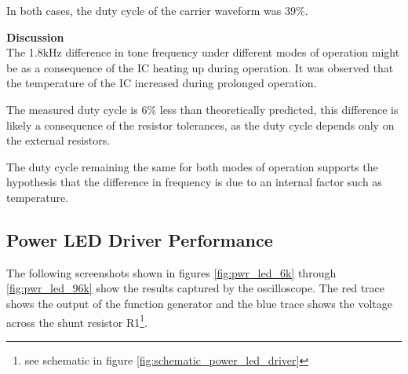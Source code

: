 In both cases, the duty cycle of the carrier waveform was 39\%.


\textbf{Discussion}\\
The 1.8kHz difference in tone frequency under different modes of operation might be as a consequence of the IC heating up during operation. It was observed that the temperature of the IC increased during prolonged operation.

The measured duty cycle is 6\% less than theoretically predicted, this difference is likely a consequence of the resistor tolerances, as the duty cycle depends only on the external resistors.

The duty cycle remaining the same for both modes of operation supports the hypothesis that the difference in frequency is due to an internal factor such as temperature.






\subsection{Power LED Driver Performance}

The following screenshots shown in figures \ref{fig:pwr_led_6k} through \ref{fig:pwr_led_96k} show the results captured by the oscilloscope. The red trace shows the output of the function generator and the blue trace shows the voltage across the shunt resistor R1\footnote{see schematic in figure \ref{fig:schematic_power_led_driver}}.

